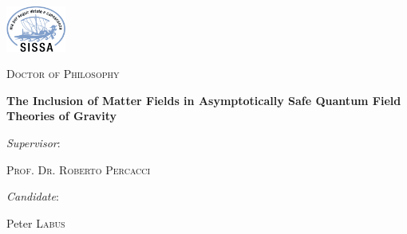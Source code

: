 \documentclass[12pt,a4paper]{report}
\begin{document}
\begin{titlepage}
  \begin{center}
    \vspace{1cm}

    \includegraphics[height=1.5cm]{sissa_logo.jpg} \hfill

    \vspace{2cm}

    {\scshape\LARGE Doctor of Philosophy \par}

    \vspace{3.5cm}

    {\huge\bfseries The Inclusion of Matter Fields in Asymptotically Safe Quantum Field Theories of Gravity}

  \end{center}

  \vspace{2cm}

  \vfill

  \textit{Supervisor}:\par
  \textsc{Prof. Dr. Roberto Percacci}%
  \vspace{1cm}

  \begin{flushright}
    \textit{Candidate}:\par
    Peter \textsc{Labus}
  \end{flushright}
  \vfill

  \centering

\end{titlepage}
\end{document}
